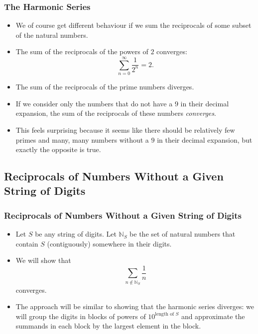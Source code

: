 \documentclass{beamer}
\begin{document}
\begin{frame}
    \frametitle{The Harmonic Series}

    \begin{itemize}
        \item We of course get different behaviour if we sum the reciprocals of some subset of the natural numbers. \pause
        \item The sum of the reciprocals of the powers of $2$ converges:
        \[
            \sum_{n = 0}^{\infty} \frac{1}{2^n} = 2.    
        \]
        \pause
        \item The sum of the reciprocals of the prime numbers diverges. \pause
        \item If we consider only the numbers that do not have a $9$ in their decimal expansion, the sum of the reciprocals of these numbers \emph{converges}. \pause
        \item This feels surprising because it seems like there should be relatively few primes and many, many numbers without a $9$ in their decimal expansion, but exactly the opposite is true.
    \end{itemize}

\end{frame}

\subsection{Reciprocals of Numbers Without a Given String of Digits}

\begin{frame}
    \frametitle{Reciprocals of Numbers Without a Given String of Digits}

    \begin{itemize}
        \item Let $S$ be any string of digits. Let $\mathbb{N}_S$ be the set of natural numbers that contain $S$ (contiguously) somewhere in their digits. \pause
        \item We will show that
        \[
            \sum_{n \not\in \mathbb{N}_S} \frac{1}{n}    
        \]
        converges. \pause
        \item The approach will be similar to showing that the harmonic series diverges: we will group the digits in blocks of powers of $10^{\text{length of } S}$ and approximate the summands in each block by the largest element in the block.
    \end{itemize} 

\end{frame}
\end{document}
